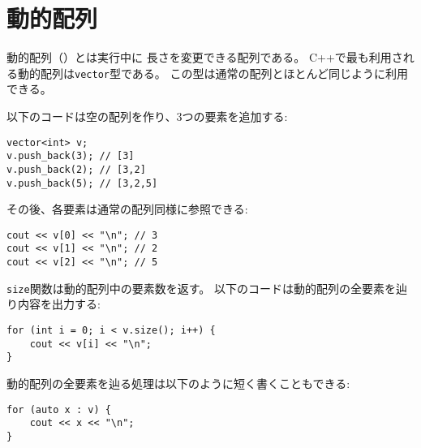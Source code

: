 \section{動的配列}


動的配列（）とは実行中に
長さを変更できる配列である。
C++で最も利用される動的配列は\texttt{vector}型である。
この型は通常の配列とほとんど同じように利用できる。

以下のコードは空の配列を作り、3つの要素を追加する:

\begin{lstlisting}
vector<int> v;
v.push_back(3); // [3]
v.push_back(2); // [3,2]
v.push_back(5); // [3,2,5]
\end{lstlisting}

\begin{comment}
After this, the elements can be accessed like in an ordinary array:
\end{comment}

その後、各要素は通常の配列同様に参照できる:

\begin{lstlisting}
cout << v[0] << "\n"; // 3
cout << v[1] << "\n"; // 2
cout << v[2] << "\n"; // 5
\end{lstlisting}

\begin{comment}
The function \texttt{size} returns the number of elements in the vector.
The following code iterates through
the vector and prints all elements in it:
\end{comment}

\texttt{size}関数は動的配列中の要素数を返す。
以下のコードは動的配列の全要素を辿り内容を出力する:

\begin{lstlisting}
for (int i = 0; i < v.size(); i++) {
    cout << v[i] << "\n";
}
\end{lstlisting}

\begin{samepage}
\begin{comment}
A shorter way to iterate through a vector is as follows:
\end{comment}
動的配列の全要素を辿る処理は以下のように短く書くこともできる:

\begin{lstlisting}
for (auto x : v) {
    cout << x << "\n";
}
\end{lstlisting}
\end{samepage}

